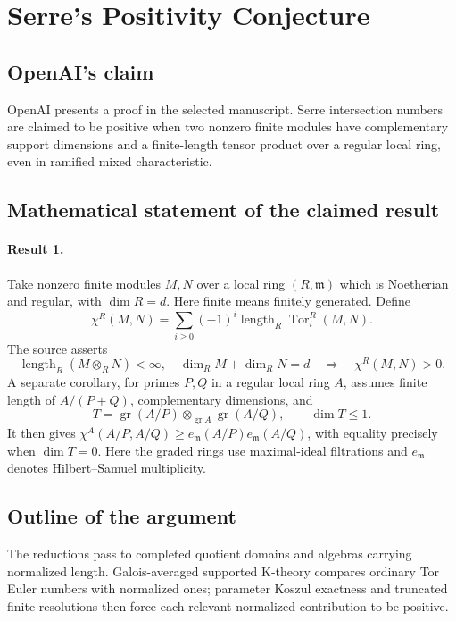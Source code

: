\documentclass[11pt]{article}
\begin{document}
\section*{Serre's Positivity Conjecture}

\subsection{OpenAI's claim}
OpenAI presents a proof in the selected manuscript. Serre intersection numbers are claimed to be positive when two nonzero finite modules have complementary support dimensions and a finite-length tensor product over a regular local ring, even in ramified mixed characteristic.

\subsection{Mathematical statement of the claimed result}
\paragraph{Result 1.} Take nonzero finite modules \(M,N\) over a local ring \((R,\mathfrak m)\) which is Noetherian and regular, with \(\dim R=d\). Here finite means finitely generated. Define
\[
 \chi^R(M,N)=\sum_{i\ge0}(-1)^i\operatorname{length}_R\operatorname{Tor}^R_i(M,N).
\]
The source asserts
\[
 \operatorname{length}_R(M\otimes_RN)<\infty,\quad
 \dim_RM+\dim_RN=d\quad\Longrightarrow\quad\chi^R(M,N)>0.
\]
A separate corollary, for primes \(P,Q\) in a regular local ring \(A\), assumes finite length of \(A/(P+Q)\), complementary dimensions, and
\[
 T=\operatorname{gr}(A/P)\otimes_{\operatorname{gr}A}\operatorname{gr}(A/Q),\qquad\dim T\le1.
\]
It then gives \(\chi^A(A/P,A/Q)\ge e_{\mathfrak m}(A/P)e_{\mathfrak m}(A/Q)\), with equality precisely when \(\dim T=0\). Here the graded rings use maximal-ideal filtrations and \(e_{\mathfrak m}\) denotes Hilbert--Samuel multiplicity.

\subsection{Outline of the argument}
The reductions pass to completed quotient domains and algebras carrying normalized length. Galois-averaged supported K-theory compares ordinary Tor Euler numbers with normalized ones; parameter Koszul exactness and truncated finite resolutions then force each relevant normalized contribution to be positive.
\end{document}
